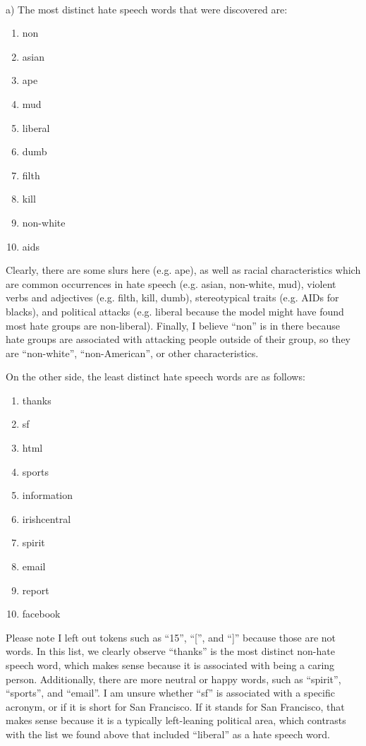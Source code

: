 \begin{solution} \ \\
a) The most distinct hate speech words that were discovered are:
\begin{enumerate}
	\item non
	\item asian
	\item ape
	\item mud
	\item liberal
	\item dumb
	\item filth
	\item kill
	\item non-white
	\item aids
\end{enumerate}
Clearly, there are some slurs here (e.g. ape), as well as racial characteristics which are common occurrences in hate speech (e.g. asian, non-white, mud), violent verbs and adjectives (e.g. filth, kill, dumb), stereotypical traits (e.g. AIDs for blacks), and political attacks (e.g. liberal because the model might have found most hate groups are non-liberal). Finally, I believe ``non'' is in there because hate groups are associated with attacking people outside of their group, so they are ``non-white'', ``non-American'', or other characteristics.

On the other side, the least distinct hate speech words are as follows:
\begin{enumerate}
	\item thanks
	\item sf
	\item html
	\item sports
	\item information
	\item irishcentral
	\item spirit
	\item email
	\item report
	\item facebook
\end{enumerate}
Please note I left out tokens such as ``15'', ``['', and ``]'' because those are not words. In this list, we clearly observe ``thanks'' is the most distinct non-hate speech word, which makes sense because it is associated with being a caring person. Additionally, there are more neutral or happy words, such as ``spirit'', ``sports'', and ``email''. I am unsure whether ``sf'' is associated with a specific acronym, or if it is short for San Francisco. If it stands for San Francisco, that makes sense because it is a typically left-leaning political area, which contrasts with the list we found above that included ``liberal'' as a hate speech word.\\


\end{solution}
